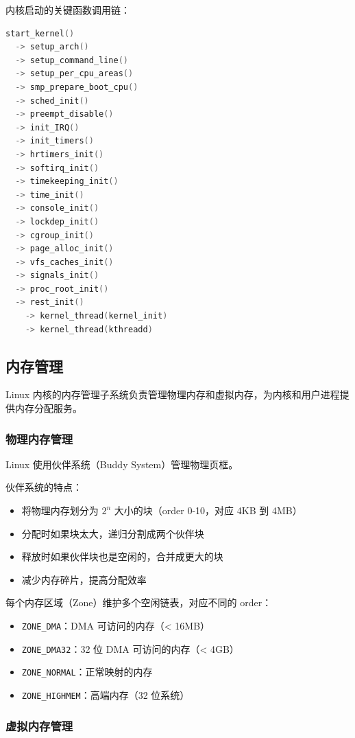 内核启动的关键函数调用链：
\begin{lstlisting}[language=C]
start_kernel()
  -> setup_arch()
  -> setup_command_line()
  -> setup_per_cpu_areas()
  -> smp_prepare_boot_cpu()
  -> sched_init()
  -> preempt_disable()
  -> init_IRQ()
  -> init_timers()
  -> hrtimers_init()
  -> softirq_init()
  -> timekeeping_init()
  -> time_init()
  -> console_init()
  -> lockdep_init()
  -> cgroup_init()
  -> page_alloc_init()
  -> vfs_caches_init()
  -> signals_init()
  -> proc_root_init()
  -> rest_init()
    -> kernel_thread(kernel_init)
    -> kernel_thread(kthreadd)
\end{lstlisting}

\subsection{内存管理}

Linux 内核的内存管理子系统负责管理物理内存和虚拟内存，为内核和用户进程提供内存分配服务。

\subsubsection{物理内存管理}

Linux 使用伙伴系统（Buddy System）管理物理页框。

伙伴系统的特点：
\begin{itemize}
  \item 将物理内存划分为 $2^n$ 大小的块（order 0-10，对应 4KB 到 4MB）
  \item 分配时如果块太大，递归分割成两个伙伴块
  \item 释放时如果伙伴块也是空闲的，合并成更大的块
  \item 减少内存碎片，提高分配效率
\end{itemize}

每个内存区域（Zone）维护多个空闲链表，对应不同的 order：
\begin{itemize}
  \item \texttt{ZONE\_DMA}：DMA 可访问的内存（< 16MB）
  \item \texttt{ZONE\_DMA32}：32 位 DMA 可访问的内存（< 4GB）
  \item \texttt{ZONE\_NORMAL}：正常映射的内存
  \item \texttt{ZONE\_HIGHMEM}：高端内存（32 位系统）
\end{itemize}

\subsubsection{虚拟内存管理}

